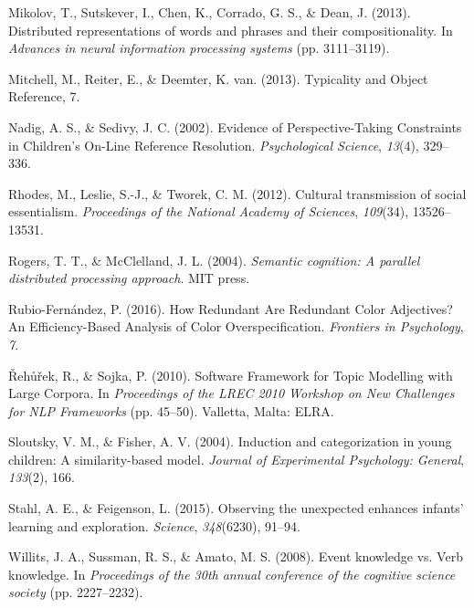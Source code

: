 \documentclass[10pt, letterpaper]{article}
\begin{document}
\leavevmode\hypertarget{ref-mikolov2013}{}%
Mikolov, T., Sutskever, I., Chen, K., Corrado, G. S., \& Dean, J.
(2013). Distributed representations of words and phrases and their
compositionality. In \emph{Advances in neural information processing
systems} (pp. 3111--3119).

\leavevmode\hypertarget{ref-mitchell_2013}{}%
Mitchell, M., Reiter, E., \& Deemter, K. van. (2013). Typicality and
Object Reference, 7.

\leavevmode\hypertarget{ref-nadig_2002}{}%
Nadig, A. S., \& Sedivy, J. C. (2002). Evidence of Perspective-Taking
Constraints in Children's On-Line Reference Resolution.
\emph{Psychological Science}, \emph{13}(4), 329--336.

\leavevmode\hypertarget{ref-rhodes2012}{}%
Rhodes, M., Leslie, S.-J., \& Tworek, C. M. (2012). Cultural
transmission of social essentialism. \emph{Proceedings of the National
Academy of Sciences}, \emph{109}(34), 13526--13531.

\leavevmode\hypertarget{ref-rogers2004}{}%
Rogers, T. T., \& McClelland, J. L. (2004). \emph{Semantic cognition: A
parallel distributed processing approach}. MIT press.

\leavevmode\hypertarget{ref-rubio-fernandez_2016}{}%
Rubio-Fernández, P. (2016). How Redundant Are Redundant Color
Adjectives? An Efficiency-Based Analysis of Color Overspecification.
\emph{Frontiers in Psychology}, \emph{7}.

\leavevmode\hypertarget{ref-rehurek2010}{}%
Řehůřek, R., \& Sojka, P. (2010). Software Framework for Topic Modelling
with Large Corpora. In \emph{Proceedings of the LREC 2010 Workshop on
New Challenges for NLP Frameworks} (pp. 45--50). Valletta, Malta: ELRA.

\leavevmode\hypertarget{ref-sloutsky2004}{}%
Sloutsky, V. M., \& Fisher, A. V. (2004). Induction and categorization
in young children: A similarity-based model. \emph{Journal of
Experimental Psychology: General}, \emph{133}(2), 166.

\leavevmode\hypertarget{ref-stahl2015}{}%
Stahl, A. E., \& Feigenson, L. (2015). Observing the unexpected enhances
infants' learning and exploration. \emph{Science}, \emph{348}(6230),
91--94.

\leavevmode\hypertarget{ref-willits2008}{}%
Willits, J. A., Sussman, R. S., \& Amato, M. S. (2008). Event knowledge
vs. Verb knowledge. In \emph{Proceedings of the 30th annual conference
of the cognitive science society} (pp. 2227--2232).


\end{document}
